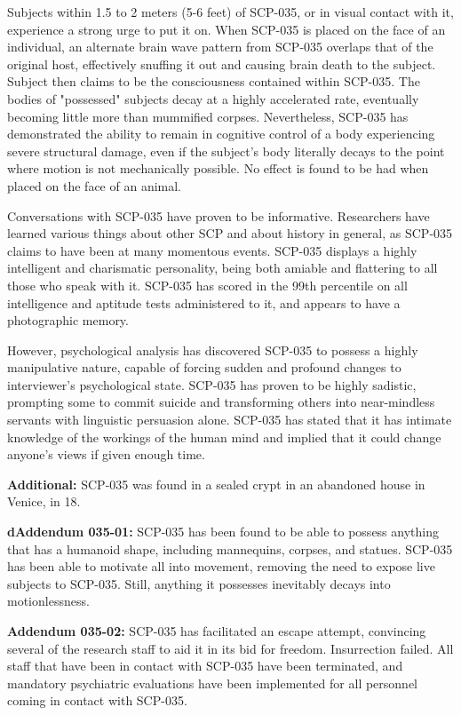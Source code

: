 Subjects within 1.5 to 2 meters (5-6 feet) of SCP-035, or in visual contact with it, experience a strong urge to put it on. When SCP-035 is placed on the face of an individual, an alternate brain wave pattern from SCP-035 overlaps that of the original host, effectively snuffing it out and causing brain death to the subject. Subject then claims to be the consciousness contained within SCP-035. The bodies of "possessed" subjects decay at a highly accelerated rate, eventually becoming little more than mummified corpses. Nevertheless, SCP-035 has demonstrated the ability to remain in cognitive control of a body experiencing severe structural damage, even if the subject's body literally decays to the point where motion is not mechanically possible. No effect is found to be had when placed on the face of an animal.

Conversations with SCP-035 have proven to be informative. Researchers have learned various things about other SCP and about history in general, as SCP-035 claims to have been at many momentous events. SCP-035 displays a highly intelligent and charismatic personality, being both amiable and flattering to all those who speak with it. SCP-035 has scored in the 99th percentile on all intelligence and aptitude tests administered to it, and appears to have a photographic memory.

However, psychological analysis has discovered SCP-035 to possess a highly manipulative nature, capable of forcing sudden and profound changes to interviewer's psychological state. SCP-035 has proven to be highly sadistic, prompting some to commit suicide and transforming others into near-mindless servants with linguistic persuasion alone. SCP-035 has stated that it has intimate knowledge of the workings of the human mind and implied that it could change anyone's views if given enough time.

\textbf{Additional:} SCP-035 was found in a sealed crypt in an abandoned house in Venice, in 18.

\textbf{dAddendum 035-01:} SCP-035 has been found to be able to possess anything that has a humanoid shape, including mannequins, corpses, and statues. SCP-035 has been able to motivate all into movement, removing the need to expose live subjects to SCP-035. Still, anything it possesses inevitably decays into motionlessness.

\textbf{Addendum 035-02:} SCP-035 has facilitated an escape attempt, convincing several of the research staff to aid it in its bid for freedom. Insurrection failed. All staff that have been in contact with SCP-035 have been terminated, and mandatory psychiatric evaluations have been implemented for all personnel coming in contact with SCP-035.

